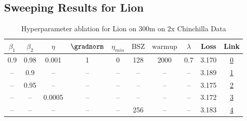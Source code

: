 \subsection{Sweeping Results for Lion}%
\begin{table}[H]
\centering
\caption{Hyperparameter ablation for Lion on 300m on 2x Chinchilla Data}
\label{tab:ablation_lion_300m_on_2x_chinchilla_data}
\begin{tabular}{cccccccccc}
\toprule
$\beta_1$ & $\beta_2$ & $\eta$ & $\gradnorm$ & $\eta_{min}$ & $\mathrm{BSZ}$ & $\mathrm{warmup}$ & $\lambda$ & Loss & Link \\
\midrule
0.9 & 0.98 & 0.001 & 1 & 0 & 128 & 2000 & 0.7 & 3.170 & \href{https://wandb.ai/stanford-mercury/optimizer-scaling/runs/sweep-300m-12B-lion5aad2alr0.001-wd0.7-minlr0-warmup2000-b10.9-b-b039e3}{0} \\
\midrule
-- & 0.9 & -- & -- & -- & -- & -- & -- & 3.189 & \href{https://wandb.ai/stanford-mercury/optimizer-scaling/runs/sweep-300m-12B-lionb554b6lr0.001-wd0.7-minlr0-warmup2000-b10.9-b-44d68f}{1} \\
-- & 0.95 & -- & -- & -- & -- & -- & -- & 3.175 & \href{https://wandb.ai/stanford-mercury/optimizer-scaling/runs/sweep-300m-12B-lion1d519dlr0.001-wd0.7-minlr0-warmup2000-b10.9-b-2aa8be}{2} \\
-- & -- & 0.0005 & -- & -- & -- & -- & -- & 3.172 & \href{https://wandb.ai/stanford-mercury/optimizer-scaling/runs/sweep-300m-12B-liond0e427lr0.0005-wd0.7-minlr0-warmup2000-b10.9--07e662}{3} \\
-- & -- & -- & -- & -- & 256 & -- & -- & 3.183 & \href{https://wandb.ai/stanford-mercury/optimizer-scaling/runs/sweep-300m-12B-lion804c87lr0.001-wd0.7-minlr0-warmup2000-b10.9-b-d99925}{4} \\
\bottomrule
\end{tabular}
\end{table}

